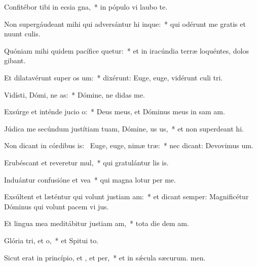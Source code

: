 \item Confitébor tibi in ecsia gna,~* in pópulo vi laubo te.
\item Non supergáudeant mihi qui adversántur hi inque:~* qui odérunt me gratis et nuunt culis.
\item Quóniam mihi quidem pacífice quetur:~* et in iracúndia terræ loquéntes, dolos gibant.
\item Et dilatavérunt super  os um:~* dixérunt: Euge, euge, vidérunt culi tri.
\item Vidísti, Dómi, ne as:~* Dómine, ne didas  me.
\item Exsúrge et inténde jucio o:~* Deus meus, et Dóminus meus in sam am.
\item Júdica me secúndum justítiam tuam, Dómine, us us,~* et non superdeant hi.
\item Non dicant in córdibus is:~\pscross{} Euge, euge, nimæ træ:~* nec dicant: Devovimus um.
\item Erubéscant et reveretur mul,~* qui gratulántur lis is.
\item Induántur confusióne et vea~* qui magna lotur per me.
\item Exsúltent et læténtur qui volunt justiam am:~* et dicant semper: Magnificétur Dóminus qui volunt pacem vi jus.
\item Et lingua mea meditábitur justiam am,~* tota die dem am.
\item Glória tri, et o,~* et Spitui to.
\item Sicut erat in princípio, et , et per,~* et in sǽcula sæcurum. men.
